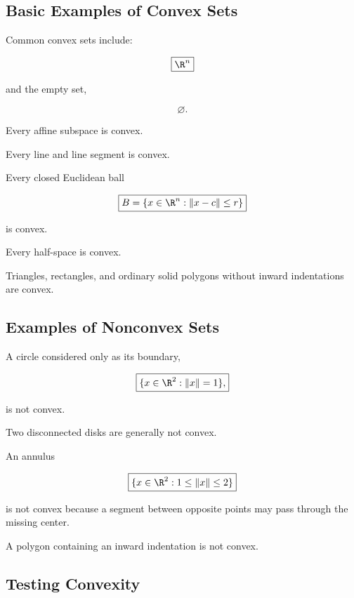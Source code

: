 \subsection{Basic Examples of Convex Sets}
\label{subsec:convex-basic-examples}

Common convex sets include:

\[
\boxed{\R^n}
\]

and the empty set,

\[
\boxed{\varnothing}.
\]

Every affine subspace is convex.

Every line and line segment is convex.

Every closed Euclidean ball

\[
\boxed{
B=
\{x\in\R^n:\|x-c\|\leq r\}
}
\]

is convex.

Every half-space is convex.

Triangles, rectangles, and ordinary solid polygons without inward
indentations are convex.

\subsection{Examples of Nonconvex Sets}
\label{subsec:nonconvex-examples}

A circle considered only as its boundary,

\[
\boxed{
\{x\in\R^2:\|x\|=1\},
}
\]

is not convex.

Two disconnected disks are generally not convex.

An annulus

\[
\boxed{
\{x\in\R^2:1\leq\|x\|\leq2\}
}
\]

is not convex because a segment between opposite points may pass through the
missing center.

A polygon containing an inward indentation is not convex.

\subsection{Testing Convexity}
\label{subsec:testing-convexity}

